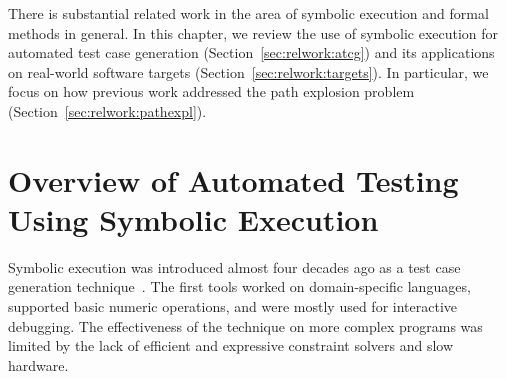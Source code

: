 There is substantial related work in the area of symbolic execution and formal methods in general.  In this chapter, we review the use of symbolic execution for automated test case generation (Section~\ref{sec:relwork:atcg}) and its applications on real-world software targets (Section~\ref{sec:relwork:targets}).  In particular, we focus on how previous work addressed the path explosion problem (Section~\ref{sec:relwork:pathexpl}).


\section{Overview of Automated Testing Using Symbolic Execution}



Symbolic execution was introduced almost four decades ago as a test case generation technique~\cite{king:symbolic:2, boyer:symbolic}.  The first tools worked on domain-specific languages, supported basic numeric operations, and were mostly used for interactive debugging.  The effectiveness of the technique on more complex programs was limited by the lack of efficient and expressive constraint solvers and slow hardware.



